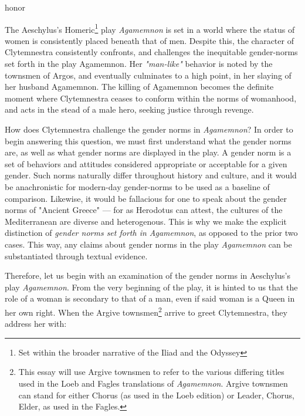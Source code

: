 honor%

The Aeschylus's Homeric\footnote{Set within the broader narrative of the Iliad
and the Odyssey} play \emph{Agamemnon} is set in a world where the status of
women is consistently placed beneath that of men. Despite this, the character of
Clytemnestra consistently confronts, and challenges the inequitable gender-norms
set forth in the play Agamemnon. Her \emph{"man-like"} behavior is noted by the
townsmen of Argos, and eventually culminates to a high point, in her slaying of
her husband Agamemnon. The killing of Agamemnon becomes the definite moment
where Clytemnestra ceases to conform within the norms of womanhood, and acts in
the stead of a male hero, seeking justice through revenge.

\clearpage %

How does Clytemnestra challenge the gender norms in \emph{Agamemnon}? In order
to begin answering this question, we must first understand what the gender norms
are, as well as what gender norms are displayed in the play. A gender norm is a
set of behaviors and attitudes considered appropriate or acceptable for a given
gender. Such norms naturally differ throughout history and culture, and it
would be anachronistic for modern-day gender-norms to be used as a baseline
of comparison. Likewise, it would be fallacious for one to speak about the
gender norms of "Ancient Greece" --- for as Herodotus can attest, the cultures
of the Mediterranean are diverse and heterogenous. This is why we make the
explicit distinction of \emph{gender norms set forth in Agamemnon}, as opposed
to the prior two cases. This way, any claims about gender norms in the play
\emph{Agamemnon} can be substantiated through textual evidence.

Therefore, let us begin with an examination of the gender norms in Aeschylus's
play \emph{Agamemnon}. From the very beginning of the play, it is hinted to us
that the role of a woman is secondary to that of a man, even if said woman is a
Queen in her own right. When the Argive townsmen\footnote{This essay
will use Argive townsmen to refer to the various differing titles used in the
Loeb and Fagles translations of \emph{Agamemnon}. Argive townsmen can stand for
either Chorus (as used in the Loeb edition) or Leader, Chorus, Elder, as used in
the Fagles.} arrive to greet Clytemnestra, they address her with:

